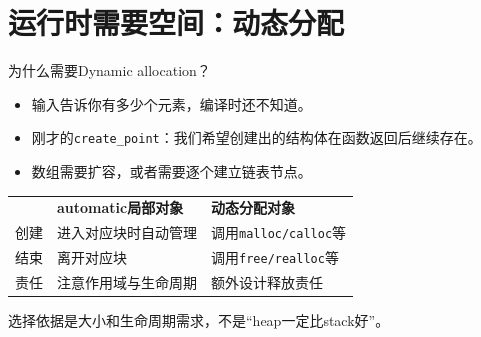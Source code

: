 \section{运行时需要空间：动态分配}

\begin{frame}{为什么需要Dynamic allocation？}
\begin{itemize}
\item 输入告诉你有多少个元素，编译时还不知道。
\item 刚才的\texttt{create\_point}：我们希望创建出的结构体在函数返回后继续存在。
\item 数组需要扩容，或者需要逐个建立链表节点。
\end{itemize}
\medskip
\begin{tabular}{lll}
 & \textbf{automatic局部对象} & \textbf{动态分配对象}\\[4pt]
创建 & 进入对应块时自动管理 & 调用\texttt{malloc/calloc}等\\
结束 & 离开对应块 & 调用\texttt{free/realloc}等\\
责任 & 注意作用域与生命周期 & 额外设计释放责任
\end{tabular}
\medskip\par\alert{选择依据是大小和生命周期需求，不是“heap一定比stack好”。}

\end{frame}

